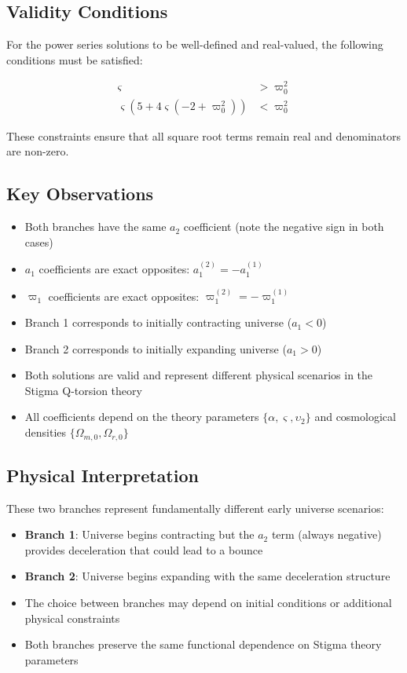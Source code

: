 \documentclass{article}
\begin{document}
\subsection{Validity Conditions}

For the power series solutions to be well-defined and real-valued, the following conditions must be satisfied:

\begin{align}
\varsigma &> \varpi_0^2 \\
\varsigma (5 + 4 \varsigma (-2 + \varpi_0^2)) &< \varpi_0^2
\end{align}

These constraints ensure that all square root terms remain real and denominators are non-zero.

\subsection{Key Observations}

\begin{itemize}
\item Both branches have the same $a_2$ coefficient (note the negative sign in both cases)
\item $a_1$ coefficients are exact opposites: $a_1^{(2)} = -a_1^{(1)}$
\item $\varpi_1$ coefficients are exact opposites: $\varpi_1^{(2)} = -\varpi_1^{(1)}$
\item Branch 1 corresponds to initially contracting universe ($a_1 < 0$)
\item Branch 2 corresponds to initially expanding universe ($a_1 > 0$)
\item Both solutions are valid and represent different physical scenarios in the Stigma Q-torsion theory
\item All coefficients depend on the theory parameters $\{\alpha, \varsigma, \upsilon_2\}$ and cosmological densities $\{\Omega_{m,0}, \Omega_{r,0}\}$
\end{itemize}

\subsection{Physical Interpretation}

These two branches represent fundamentally different early universe scenarios:
\begin{itemize}
\item \textbf{Branch 1}: Universe begins contracting but the $a_2$ term (always negative) provides deceleration that could lead to a bounce
\item \textbf{Branch 2}: Universe begins expanding with the same deceleration structure
\item The choice between branches may depend on initial conditions or additional physical constraints
\item Both branches preserve the same functional dependence on Stigma theory parameters
\end{itemize}
\end{document}
